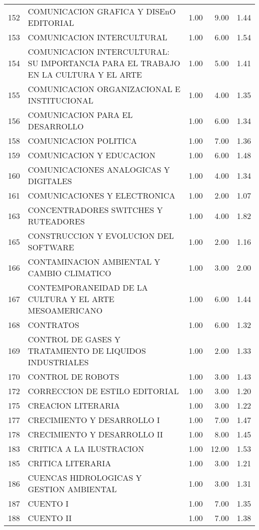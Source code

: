 \begin{table}[ht]
\begin{tabular}{rlrrr}
  152 & COMUNICACION GRAFICA Y DISEnO EDITORIAL & 1.00 & 9.00 & 1.44 \\ 
  153 & COMUNICACION INTERCULTURAL & 1.00 & 6.00 & 1.54 \\ 
  154 & COMUNICACION INTERCULTURAL: SU IMPORTANCIA PARA EL TRABAJO EN LA CULTURA Y EL ARTE & 1.00 & 5.00 & 1.41 \\ 
  155 & COMUNICACION ORGANIZACIONAL E INSTITUCIONAL & 1.00 & 4.00 & 1.35 \\ 
  156 & COMUNICACION PARA EL DESARROLLO & 1.00 & 6.00 & 1.34 \\ 
  158 & COMUNICACION POLITICA & 1.00 & 7.00 & 1.36 \\ 
  159 & COMUNICACION Y EDUCACION & 1.00 & 6.00 & 1.48 \\ 
  160 & COMUNICACIONES ANALOGICAS Y DIGITALES & 1.00 & 4.00 & 1.34 \\ 
  161 & COMUNICACIONES Y ELECTRONICA & 1.00 & 2.00 & 1.07 \\ 
  163 & CONCENTRADORES SWITCHES Y RUTEADORES & 1.00 & 4.00 & 1.82 \\ 
  165 & CONSTRUCCION Y EVOLUCION DEL SOFTWARE & 1.00 & 2.00 & 1.16 \\ 
  166 & CONTAMINACION AMBIENTAL Y CAMBIO CLIMATICO & 1.00 & 3.00 & 2.00 \\ 
  167 & CONTEMPORANEIDAD DE LA CULTURA Y EL ARTE MESOAMERICANO & 1.00 & 6.00 & 1.44 \\ 
  168 & CONTRATOS & 1.00 & 6.00 & 1.32 \\ 
  169 & CONTROL DE GASES Y TRATAMIENTO DE LIQUIDOS INDUSTRIALES & 1.00 & 2.00 & 1.33 \\ 
  170 & CONTROL DE ROBOTS & 1.00 & 3.00 & 1.43 \\ 
  172 & CORRECCION DE ESTILO EDITORIAL & 1.00 & 3.00 & 1.20 \\ 
  175 & CREACION LITERARIA & 1.00 & 3.00 & 1.22 \\ 
  177 & CRECIMIENTO Y DESARROLLO I & 1.00 & 7.00 & 1.47 \\ 
  178 & CRECIMIENTO Y DESARROLLO II & 1.00 & 8.00 & 1.45 \\ 
  183 & CRITICA A LA ILUSTRACION & 1.00 & 12.00 & 1.53 \\ 
  185 & CRITICA LITERARIA & 1.00 & 3.00 & 1.21 \\ 
  186 & CUENCAS HIDROLOGICAS Y GESTION AMBIENTAL & 1.00 & 3.00 & 1.31 \\ 
  187 & CUENTO I & 1.00 & 7.00 & 1.35 \\ 
  188 & CUENTO II & 1.00 & 7.00 & 1.38 \\ 

\end{tabular}
\end{table}
